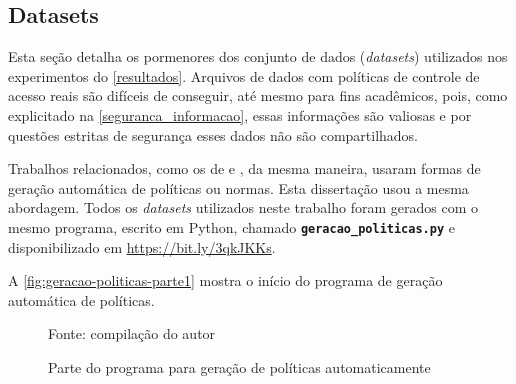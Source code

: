 \subsection{Datasets}\label{datasets}
Esta seção detalha os pormenores dos conjunto de dados (\textit{datasets}) utilizados nos experimentos do \autoref{resultados}.
Arquivos de dados com políticas de controle de acesso reais são difíceis de conseguir, até mesmo para fins acadêmicos, pois, como explicitado na \autoref{seguranca_informacao}, essas informações são valiosas e por questões estritas de segurança esses dados não são compartilhados.

Trabalhos relacionados, como os de \cite{sarkis2017} e \cite{eduardo2017}, da mesma maneira, usaram formas de geração automática de políticas ou normas. Esta dissertação usou a mesma abordagem. Todos os \textit{datasets} utilizados neste trabalho foram gerados com o mesmo programa, escrito em Python, chamado \texttt{\textbf{geracao\_politicas.py}}  e disponibilizado em \hyperlink{https://bit.ly/3qkJKKs}{https://bit.ly/3qkJKKs}.


A \autoref{fig:geracao-politicas-parte1} mostra o início do programa de geração automática de políticas.
\begin{figure}[h!]
	\centering
	\caption{Parte do programa para geração de políticas automaticamente}
	
	\label{fig:geracao-politicas-parte1}
	{\scriptsize Fonte: compilação do autor}
\end{figure}


